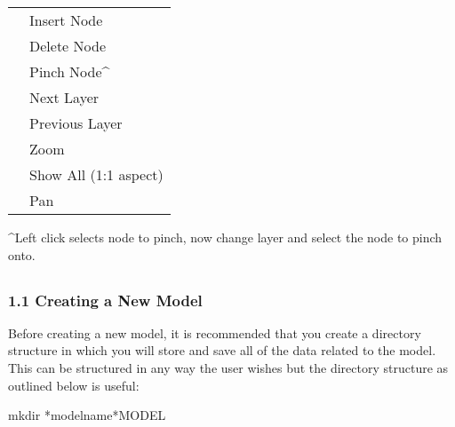 \documentclass[a4paper,10pt,english]{sphinxmanual}
\begin{document}
\begin{savenotes}\sphinxattablestart
\centering
\begin{tabulary}{\linewidth}[t]{|T|T|}
\hline
{}\relax &\relax \\
\hline
{}
&
Insert Node
\\
\hline
{}
&
Delete Node
\\
\hline
{}
&
Pinch Node\textasciicircum{}
\\
\hline
\sphinxstylestrong{\textgreater{}}
&
Next Layer
\\
\hline
\sphinxstylestrong{\textless{}}
&
Previous Layer
\\
\hline
{}
&
Zoom
\\
\hline
{}
&
Show All (1:1 aspect)
\\
\hline
{}
&
Pan
\\
\hline
\end{tabulary}
\par
\sphinxattableend\end{savenotes}

\textasciicircum{}Left click selects node to pinch, now change layer and select the node to pinch onto.


\subsection{}
\label{\detokenize{manual_models:models}}\label{\detokenize{manual_models::doc}}
\begin{DUlineblock}{0em}
\item[] 
\end{DUlineblock}


\subsubsection{1.1 Creating a New Model}
\label{\detokenize{manual_models:creating-a-new-model}}
Before creating a new model, it is recommended that you create a directory structure in which you will store and save
all of the data related to the model. This can be structured in any way the user wishes but the directory structure
as outlined below is useful:

%
\begin{sphinxVerbatim}[commandchars=\\\{\}]
mkdir *model\PYGZhy{}name*\PYGZus{}MODEL
\end{sphinxVerbatim}
\end{document}
